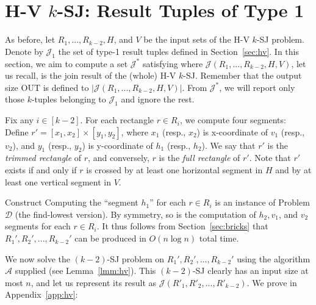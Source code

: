 \documentclass[sigconf]{acmart}
\def\vgap{\vspace{1mm}}
\def\extraspacing{\vspace{2mm} \noindent}
\def\A{\mathcal{A}}
\def\J{\mathcal{J}}
\def\out{\mathrm{OUT}}
\begin{document}
\section{H-V $k$-SJ: Result Tuples of Type 1} \label{sec:hv:type1}

As before, let $R_1, ..., R_{k-2}, H$, and $V$ be the input sets of the H-V $k$-SJ problem. Denote by $\J_1$ the set of type-1 result tuples defined in Section~\ref{sec:hv}. In this section, we aim to compute a set $\J^*$ satisfying
\myeqn{
    \J_1
    \subseteq
    \J^*
    \subseteq
    \J(R_1, ..., R_{k-2}, H, V) \label{eqn:hv:type1:J*}
}
where $\J(R_1, ..., R_{k-2}, H, V)$, let us recall, is the join result of the (whole) H-V $k$-SJ. Remember that the output size $\out$ is defined to $|\J(R_1, ..., R_{k-2}, H, V)|$. From $\J^*$, we will report only those $k$-tuples belonging to $\J_1$ and ignore the rest. 

\extraspacing {\bf Sets $\bm{R_1', R_2', ..., R'_{k-2}}$.} Fix any $i \in [k-2]$. For each rectangle $r \in R_i$, we compute four segments:
Define $r' = [x_1, x_2] \times [y_1, y_2]$, where $x_1$ (resp., $x_2$) is x-coordinate of $v_1$ (resp., $v_2$), and $y_1$ (resp., $y_2$) is y-coordinate of $h_1$ (resp., $h_2$). We say that $r'$ is the {\em trimmed rectangle} of $r$, and conversely, $r$ is the {\em full rectangle} of $r'$. Note that $r'$ exists if and only if $r$ is crossed by at least one horizontal segment in $H$ and by at least one vertical segment in $V$. 


\vgap 

Construct
Computing the ``segment $h_1$'' for each $r \in R_i$ is an instance of Problem $\mathscr{D}$ (the find-lowest version). By symmetry, so is the computation of $h_2, v_1$, and $v_2$ segments for each $r \in R_i$. It thus follows from Section~\ref{sec:bricks} that $R_1', R_2', ..., R_{k-2}'$ can be produced in $O(n \log n)$ total time.

\vgap

We now solve the $(k-2)$-SJ problem on $R_1', R_2', ..., R_{k-2}'$ using the algorithm $\A$ supplied (see Lemma~\ref{lmm:hv}). This $(k-2)$-SJ clearly has an input size at most $n$, and let us represent its result as $\J(R'_1, R'_2, ..., R'_{k-2})$. We prove in Appendix~\ref{app:hv}:
\end{document}
